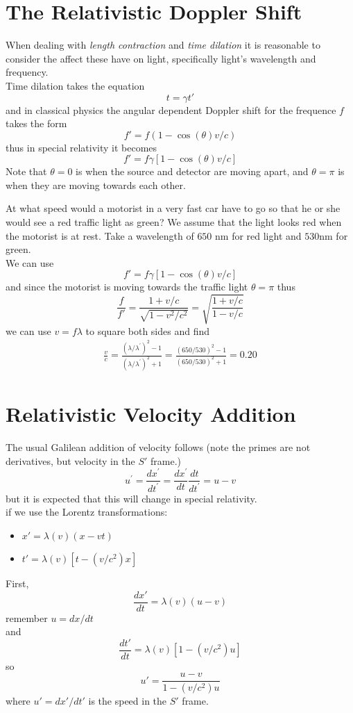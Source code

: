 \section{The Relativistic Doppler Shift}
When dealing with \textit{length contraction} and \textit{time dilation} it is reasonable to consider the affect these have on light, specifically light's wavelength and frequency. \\
Time dilation takes the equation \[ t = \gamma t' \] and in classical physics the angular dependent Doppler shift for the frequence $ f $ takes the form \[ f' = f(1-\cos(\theta) v/c) \] thus in special relativity it becomes \[ f' = f\gamma \left[1 - \cos(\theta) v/c\right] \] Note that $ \theta = 0 $ is when the source and detector are moving apart, and $ \theta = \pi $ is when they are moving towards each other. 
\begin{example}
	At what speed would a motorist in a very fast car have to go so that he or she would see a red traffic light as green? We assume that the light looks red when the motorist is at rest. Take a wavelength of $ 650 $ nm for red light and $ 530 $nm for green. \\
	
	We can use 
	\[ f' = f\gamma \left[1 - \cos(\theta) v/c\right] \]
	and since the motorist is moving towards the traffic light $ \theta = \pi $ thus 
	\[ \dfrac{f}{f'} = \dfrac{1 + v/c}{\sqrt{1 - v^2/c^2}} = \sqrt{\dfrac{1 + v/c}{1 - v/c}}\]
	we can use $ v = f\lambda $ to square both sides and find 
	\begin{align*}
	\frac { v } { c } = \frac { \left( \lambda / \lambda ^ { \prime } \right) ^ { 2 } - 1 } { \left( \lambda / \lambda ^ { \prime } \right) ^ { 2 } + 1 } = \frac { ( 650 / 530 ) ^ { 2 } - 1 } { ( 650 / 530 ) ^ { 2 } + 1 } = 0.20
	\end{align*}
\end{example}
\section{Relativistic Velocity Addition}
The usual Galilean addition of velocity follows (note the primes are not derivatives, but velocity in the $ S' $ frame.)
\[ u ^ { \prime } = \frac { d x ^ { \prime } } { d t ^ { \prime } } = \frac { d x ^ { \prime } } { d t } \frac { d t } { d t ^ { \prime } } = u - v \]
but it is expected that this will change in special relativity. \\
if we use the Lorentz transformations: 
\begin{itemize}
	\item $ x' = \lambda(v)(x-vt) $
	\item $ t' = \lambda(v)[t-(v/c^2)x] $
\end{itemize}
First, 
\[ \dfrac{dx'}{dt} = \lambda(v)(u-v)\]
remember $ u = dx/dt $\\
and
\[ \dfrac{dt'}{dt} = \lambda(v)[1-(v/c^2)u] \]
so 
\[ u' = \dfrac{u-v}{1-(v/c^2)u} \]
where $  u' = dx'/dt' $ is the speed in the $ S' $ frame. 
